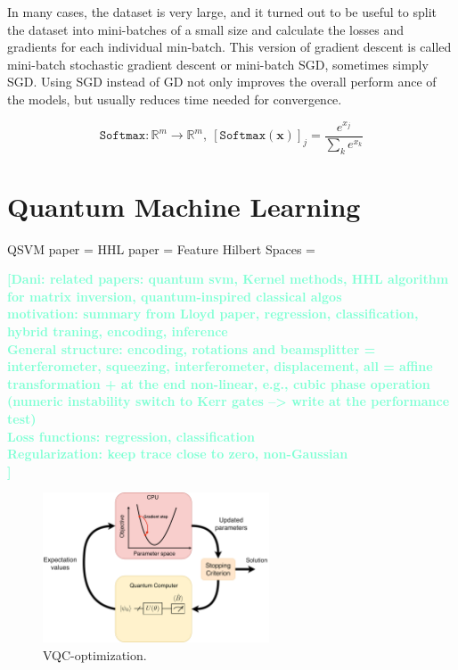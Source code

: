 \documentclass[12pt, a4paper,  nobibnotes]{article}
\newcommand{\nd}[1]{\textcolor{Aquamarine}{\textbf{[Dani: #1]}}}
\begin{document}
In many cases, the dataset is very large, and it turned out to be useful to split the dataset 
into mini-batches of a small size and calculate the losses and gradients for each individual 
min-batch. This version of gradient descent is called mini-batch stochastic gradient descent or 
mini-batch SGD, sometimes simply SGD. Using SGD instead of GD not only improves the overall perform
ance of the models, but usually reduces time needed for convergence.


\begin{equation}
    \texttt{Softmax}:\mathbb R^m \rightarrow \mathbb R^m,~\left[\texttt{Softmax}(\mathbf x)\right]_j = \frac{e^{x_j}}{\sum\limits_ke^{x_k}}
    \label{eq:softmax}
\end{equation}

\section{Quantum Machine Learning}
QSVM paper = \cite{QSVMPaper}
HHL paper = \cite{HHLPaper}
Feature Hilbert Spaces = \cite{FeatureHilbertSpaces}

\nd{related papers: quantum svm, Kernel methods, HHL algorithm for matrix inversion, quantum-inspired classical algos\\
motivation: summary from Lloyd paper, regression, classification, hybrid traning, encoding, inference\\
General structure: encoding, rotations and beamsplitter = interferometer, squeezing, interferometer, displacement, all = affine transformation + at the end non-linear, e.g., cubic phase operation (numeric instability switch to Kerr gates --> write at the performance test)  \\
Loss functions: regression, classification\\
Regularization: keep trace close to zero, non-Gaussian\\
}
\begin{figure}[H]
    \centering
    \includegraphics[width=0.6\textwidth]{figures/VQC-optimization.png}
    \caption{VQC-optimization.}
    \label{fig:VQC-optimization}
\end{figure}
\end{document}
